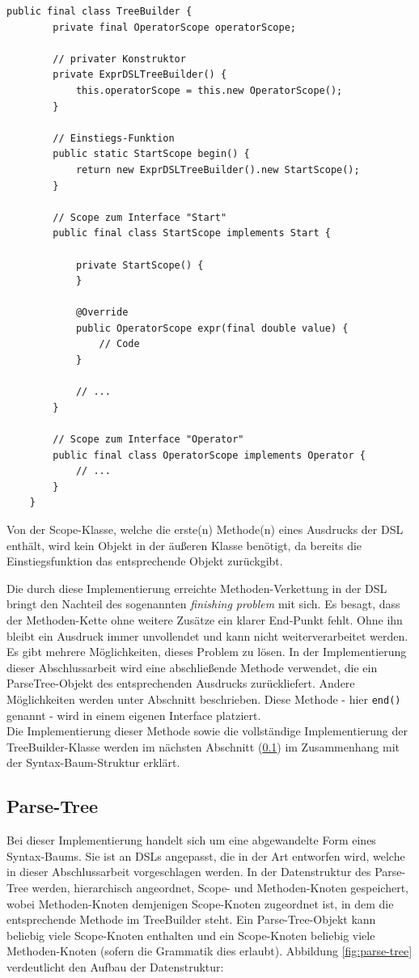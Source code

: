 \begin{lstlisting}[caption={Code für eine Builder-Klasse mit inneren Scope-Klassen},label=lst:treebuilder1]
	public final class TreeBuilder {
		private final OperatorScope operatorScope;
		
		// privater Konstruktor
		private ExprDSLTreeBuilder() {
			this.operatorScope = this.new OperatorScope();
		}
		
		// Einstiegs-Funktion
		public static StartScope begin() {
			return new ExprDSLTreeBuilder().new StartScope();
		}
		
		// Scope zum Interface "Start"
		public final class StartScope implements Start {
	
			private StartScope() {
			}
	
			@Override
			public OperatorScope expr(final double value) {
				// Code	
			}
			
			// ...
		}
		
		// Scope zum Interface "Operator"
		public final class OperatorScope implements Operator {
			// ...
		}
	}
\end{lstlisting}

Von der Scope-Klasse, welche die erste(n) Methode(n) eines Ausdrucks der DSL enthält, wird kein Objekt in der äußeren Klasse benötigt, da bereits die Einstiegsfunktion das entsprechende Objekt zurückgibt.

Die durch diese Implementierung erreichte Methoden-Verkettung in der DSL bringt den Nachteil des sogenannten \emph{finishing problem} \cite{book:fowlerDSL} mit sich. Es besagt, dass der Methoden-Kette ohne weitere Zusätze ein klarer End-Punkt fehlt. Ohne ihn bleibt ein Ausdruck immer unvollendet und kann nicht weiterverarbeitet werden. Es gibt mehrere Möglichkeiten, dieses Problem zu lösen. In der Implementierung dieser Abschlussarbeit wird eine abschließende Methode verwendet, die ein ParseTree-Objekt des entsprechenden Ausdrucks zurückliefert. Andere Möglichkeiten werden unter Abschnitt  beschrieben. Diese Methode - hier \texttt{end()} genannt - wird in einem eigenen Interface platziert.\\
Die Implementierung dieser Methode sowie die vollständige Implementierung der TreeBuilder-Klasse werden im nächsten Abschnitt (\ref{ssct:4.3.3:parsetree}) im Zusammenhang mit der Syntax-Baum-Struktur erklärt.

\subsection{Parse-Tree}\label{ssct:4.3.3:parsetree}
Bei dieser Implementierung handelt sich um eine abgewandelte Form eines Syntax-Baums. Sie ist an DSLs angepasst, die in der Art entworfen wird, welche in dieser Abschlussarbeit vorgeschlagen werden. In der Datenstruktur des Parse-Tree werden, hierarchisch angeordnet, Scope- und Methoden-Knoten gespeichert, wobei Methoden-Knoten demjenigen Scope-Knoten zugeordnet ist, in dem die entsprechende Methode im TreeBuilder steht. Ein Parse-Tree-Objekt kann beliebig viele Scope-Knoten enthalten und ein Scope-Knoten beliebig viele Methoden-Knoten (sofern die Grammatik dies erlaubt). Abbildung \ref{fig:parse-tree} verdeutlicht den Aufbau der Datenstruktur:\\

